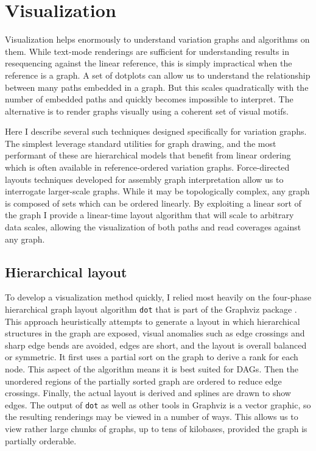\section{Visualization}

Visualization helps enormously to understand variation graphs and algorithms on them.
While text-mode renderings are sufficient for understanding results in resequencing against the linear reference, this is simply impractical when the reference is a graph.
A set of dotplots can allow us to understand the relationship between many paths embedded in a graph.
But this scales quadratically with the number of embedded paths and quickly becomes impossible to interpret.
The alternative is to render graphs visually using a coherent set of visual motifs.

Here I describe several such techniques designed specifically for variation graphs.
The simplest leverage standard utilities for graph drawing, and the most performant of these are hierarchical models that benefit from linear ordering which is often available in reference-ordered variation graphs.
Force-directed layouts techniques developed for assembly graph interpretation allow us to interrogate larger-scale graphs.
While it may be topologically complex, any graph is composed of sets which can be ordered linearly.
By exploiting a linear sort of the graph I provide a linear-time layout algorithm that will scale to arbitrary data scales, allowing the visualization of both paths and read coverages against any graph.

\subsection{Hierarchical layout}

To develop a visualization method quickly, I relied most heavily on the four-phase hierarchical graph layout algorithm {\tt dot} \cite{gansner1993technique} that is part of the Graphviz package \cite{gansner2000open,ellson2001graphviz}.
This approach heuristically attempts to generate a layout in which hierarchical structures in the graph are exposed, visual anomalies such as edge crossings and sharp edge bends are avoided, edges are short, and the layout is overall balanced or symmetric.
It first uses a partial sort on the graph to derive a rank for each node.
This aspect of the algorithm means it is best suited for DAGs.
Then the unordered regions of the partially sorted graph are ordered to reduce edge crossings.
Finally, the actual layout is derived and splines are drawn to show edges.
The output of {\tt dot} as well as other tools in Graphviz is a vector graphic, so the resulting renderings may be viewed in a number of ways.
This allows us to view rather large chunks of graphs, up to tens of kilobases, provided the graph is partially orderable.

